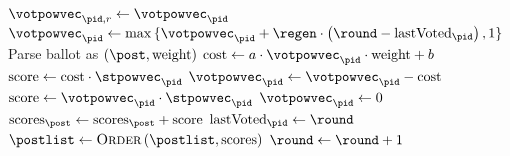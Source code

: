 \begin{algorithm}[H]
  \caption{$\textsc{HandleVote}\left(\mathrm{ballot},
  \player_{\pid}\right)$}
  \label{alg:steem:handlevote}
  \begin{algorithmic}[1]
     
      \State $\votpowvec_{\pid, r} \gets \votpowvec_{\pid}$ 
      \State $\votpowvec_{\pid} \gets \max{\lbrace \votpowvec_{\pid} + \regen
      \cdot \left(\round - \mathrm{lastVoted}_{\pid}\right), 1 \rbrace}$
      \label{alg:steem:handlevote:regen}
        \State Parse ballot as $\left(\post, \mathrm{weight}\right)$
        \State $\mathrm{cost} \gets a \cdot \votpowvec_{\pid} \cdot
        \mathrm{weight} + b$
        \label{alg:steem:handlevote:cost:start}
          \State $\mathrm{score} \gets \mathrm{cost} \cdot \stpowvec_{\pid}$
          \State $\votpowvec_{\pid} \gets \votpowvec_{\pid} - \mathrm{cost}$
        \Else
          \State $\mathrm{score} \gets \votpowvec_{\pid} \cdot
          \stpowvec_{\pid}$
          \State $\votpowvec_{\pid} \gets 0$
        \EndIf
        \label{alg:steem:handlevote:cost:end}
        \State $\mathrm{scores}_\post \gets \mathrm{scores}_\post +
        \mathrm{score}$
      \EndIf
      \State $\mathrm{lastVoted}_{\pid} \gets \round$
    \EndIf
      \State $\postlist \gets \textsc{Order}\left(\postlist,
      \mathrm{scores}\right)$ 
      \State $\round \gets \round + 1$
    \EndIf {}
  \end{algorithmic}
\end{algorithm}
